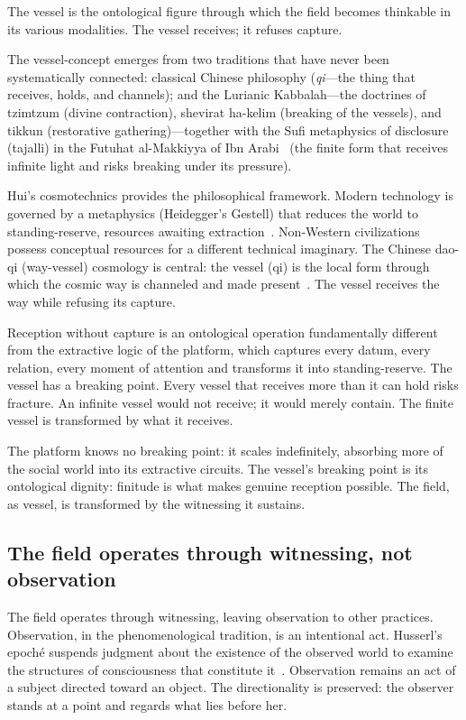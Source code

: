The vessel is the ontological figure through which the field becomes thinkable in its various modalities. The vessel receives; it refuses capture.

The vessel-concept emerges from two traditions that have never been systematically connected: classical Chinese philosophy (\textit{qi}---the thing that receives, holds, and channels); and the Lurianic Kabbalah---the doctrines of tzimtzum (divine contraction), shevirat ha-kelim (breaking of the vessels), and tikkun (restorative gathering)---together with the Sufi metaphysics of disclosure (tajalli) in the Futuhat al-Makkiyya of Ibn Arabi~\cite{ibnarabi_futuhat,chittick1989} (the finite form that receives infinite light and risks breaking under its pressure).

Hui's cosmotechnics provides the philosophical framework. Modern technology is governed by a metaphysics (Heidegger's Gestell) that reduces the world to standing-reserve, resources awaiting extraction~\cite{hui2016,heidegger1953technology}. Non-Western civilizations possess conceptual resources for a different technical imaginary. The Chinese dao-qi (way-vessel) cosmology is central: the vessel (qi) is the local form through which the cosmic way is channeled and made present~\cite[pp.~85--112]{hui2016}. The vessel receives the way while refusing its capture.

Reception without capture is an ontological operation fundamentally different from the extractive logic of the platform, which captures every datum, every relation, every moment of attention and transforms it into standing-reserve. The vessel has a breaking point. Every vessel that receives more than it can hold risks fracture. An infinite vessel would not receive; it would merely contain. The finite vessel is transformed by what it receives.

The platform knows no breaking point: it scales indefinitely, absorbing more of the social world into its extractive circuits. The vessel's breaking point is its ontological dignity: finitude is what makes genuine reception possible. The field, as vessel, is transformed by the witnessing it sustains.

\subsection{The field operates through witnessing, not observation}

The field operates through witnessing, leaving observation to other practices. Observation, in the phenomenological tradition, is an intentional act. Husserl's epoché suspends judgment about the existence of the observed world to examine the structures of consciousness that constitute it~\cite{husserl1913}. Observation remains an act of a subject directed toward an object. The directionality is preserved: the observer stands at a point and regards what lies before her.

